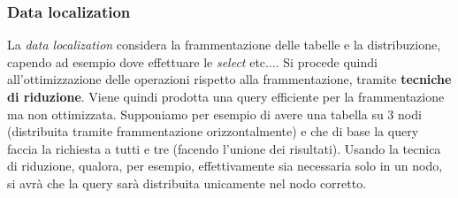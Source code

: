\documentclass[a4paper,12pt, oneside]{book}
\begin{document}
\subsubsection{Data localization}
La \textit{data localization} considera la frammentazione delle tabelle e la
distribuzione, capendo ad esempio dove effettuare le \textit{select}
etc$\ldots$. Si procede quindi all'ottimizzazione delle operazioni rispetto 
alla frammentazione, tramite \textbf{tecniche di riduzione}. Viene quindi
prodotta una query efficiente per la frammentazione ma non
ottimizzata. Supponiamo per esempio di avere una tabella su 3 nodi (distribuita
tramite frammentazione orizzontalmente) e che di base
la query faccia la richiesta a tutti e tre (facendo l'unione dei
risultati). Usando la tecnica di riduzione, qualora, per esempio, effettivamente
sia necessaria solo in un nodo, si avrà che la query sarà distribuita unicamente
nel nodo corretto.
\end{document}
